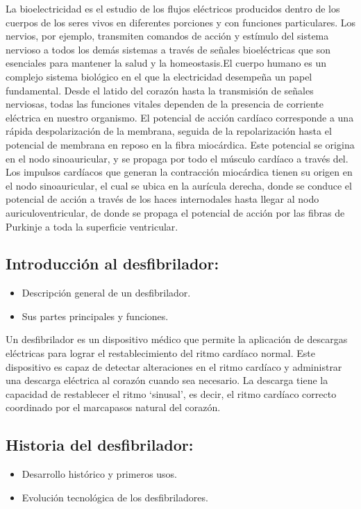 La bioelectricidad es el estudio de los flujos eléctricos producidos dentro de los cuerpos de los seres vivos en diferentes porciones y con funciones particulares. Los nervios, por ejemplo, transmiten comandos de acción y estímulo del sistema nervioso a todos los demás sistemas a través de señales bioeléctricas que son esenciales para mantener la salud y la homeostasis.El cuerpo humano es un complejo sistema biológico en el que la electricidad desempeña un papel fundamental. Desde el latido del corazón hasta la transmisión de señales nerviosas, todas las funciones vitales dependen de la presencia de corriente eléctrica en nuestro organismo. El potencial de acción cardíaco corresponde a una rápida despolarización de la membrana, seguida de la repolarización hasta el potencial de membrana en reposo en la fibra miocárdica. Este potencial se origina en el nodo sinoauricular, y se propaga por todo el músculo cardíaco a través del. Los impulsos cardíacos que generan la contracción miocárdica tienen su origen en el nodo sinoauricular, el cual se ubica en la aurícula derecha, donde se conduce el potencial de acción a través de los haces internodales hasta llegar al nodo auriculoventricular, de donde se propaga el potencial de acción por las fibras de Purkinje a toda la superficie ventricular.

\subsection{Introducción al desfibrilador:}
\begin{itemize}
    \item Descripción general de un desfibrilador.
    \item Sus partes principales y funciones.
\end{itemize}

Un desfibrilador es un dispositivo médico que permite la aplicación de descargas eléctricas para lograr el restablecimiento del ritmo cardíaco normal. Este dispositivo es capaz de detectar alteraciones en el ritmo cardíaco y administrar una descarga eléctrica al corazón cuando sea necesario. La descarga tiene la capacidad de restablecer el ritmo ‘sinusal’, es decir, el ritmo cardíaco correcto coordinado por el marcapasos natural del corazón.

\subsection{Historia del desfibrilador:}
\begin{itemize}
    \item Desarrollo histórico y primeros usos.
    \item Evolución tecnológica de los desfibriladores.
\end{itemize}

